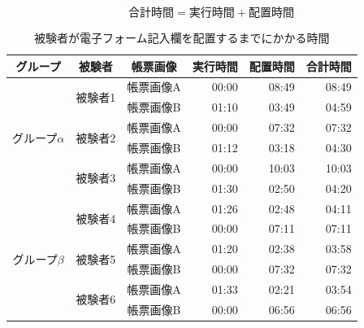 \begin{equation}\label{eq:sum_time}
    合計時間=実行時間+配置時間
\end{equation}

\begin{table}[t]
    \caption{被験者が電子フォーム記入欄を配置するまでにかかる時間}
	\label{tb:result_time}
    \centering
    \begin{tabular}{ccc||rrr} 
    グループ & 被験者 & 帳票画像 & 実行時間 & 配置時間 & 合計時間 \\
    \hline \hline
    
    \multirow{6}{*}{グループ$\alpha$} & \multirow{2}{*}{被験者1} & 帳票画像A & 00:00 & 08:49 & 08:49 \\ %
                                                            & & 帳票画像B & 01:10 & 03:49 & 04:59 \\ 
                                                            
                                    & \multirow{2}{*}{被験者2} & 帳票画像A & 00:00 & 07:32 & 07:32 \\ %
                                                            & & 帳票画像B & 01:12 & 03:18 & 04:30 \\
                                                            
                                    & \multirow{2}{*}{被験者3} & 帳票画像A & 00:00 & 10:03 & 10:03 \\ %
                                                            & & 帳票画像B & 01:30 & 02:50 & 04:20 \\
                                                            \hline
    \multirow{6}{*}{グループ$\beta$} & \multirow{2}{*}{被験者4} & 帳票画像A & 01:26 & 02:48 & 04:11 \\ %
                                                            & & 帳票画像B & 00:00 & 07:11 & 07:11 \\
                                                            
                                    & \multirow{2}{*}{被験者5} & 帳票画像A & 01:20 & 02:38 & 03:58 \\ %
                                                            & & 帳票画像B & 00:00 & 07:32 & 07:32 \\ 
                                                            
                                    & \multirow{2}{*}{被験者6} & 帳票画像A & 01:33 & 02:21 & 03:54 \\
                                                            & & 帳票画像B & 00:00 & 06:56 & 06:56 \\ 

    \end{tabular}
\end{table}

